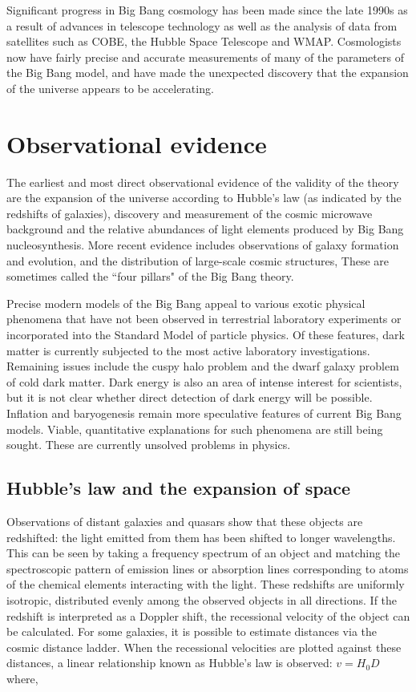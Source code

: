 \documentclass[14pt, oneside]{book}
\begin{document}
			Significant progress in Big Bang cosmology has been made since the late 1990s as a result of advances in telescope technology as well as the analysis of data from satellites such as COBE, the Hubble Space Telescope and WMAP. Cosmologists now have fairly precise and accurate measurements of many of the parameters of the Big Bang model, and have made the unexpected discovery that the expansion of the universe appears to be accelerating.
	
	\chapter{Observational evidence}
		The earliest and most direct observational evidence of the validity of the theory are the expansion of the universe according to Hubble's law (as indicated by the redshifts of galaxies), discovery and measurement of the cosmic microwave background and the relative abundances of light elements produced by Big Bang nucleosynthesis. More recent evidence includes observations of galaxy formation and evolution, and the distribution of large-scale cosmic structures, These are sometimes called the ``four pillars" of the Big Bang theory.
		
		Precise modern models of the Big Bang appeal to various exotic physical phenomena that have not been observed in terrestrial laboratory experiments or incorporated into the Standard Model of particle physics. Of these features, dark matter is currently subjected to the most active laboratory investigations. Remaining issues include the cuspy halo problem and the dwarf galaxy problem of cold dark matter. Dark energy is also an area of intense interest for scientists, but it is not clear whether direct detection of dark energy will be possible. Inflation and baryogenesis remain more speculative features of current Big Bang models. Viable, quantitative explanations for such phenomena are still being sought. These are currently unsolved problems in physics.
	
		\section{Hubble's law and the expansion of space}
			Observations of distant galaxies and quasars show that these objects are redshifted: the light emitted from them has been shifted to longer wavelengths. This can be seen by taking a frequency spectrum of an object and matching the spectroscopic pattern of emission lines or absorption lines corresponding to atoms of the chemical elements interacting with the light. These redshifts are uniformly isotropic, distributed evenly among the observed objects in all directions. If the redshift is interpreted as a Doppler shift, the recessional velocity of the object can be calculated. For some galaxies, it is possible to estimate distances via the cosmic distance ladder. When the recessional velocities are plotted against these distances, a linear relationship known as Hubble's law is observed: $v=H_{0}D$ where,
	
\end{document}
